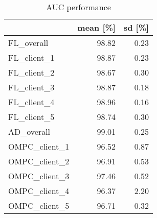\begin{table}[h]
\centering
\caption{AUC performance}
\label{tab:auc_performance}
\begin{tabular}{lrr}
\toprule
{} &  mean [\%] &  sd [\%] \\
\midrule
FL\_overall    &     98.82 &    0.23 \\
FL\_client\_1   &     98.87 &    0.23 \\
FL\_client\_2   &     98.67 &    0.30 \\
FL\_client\_3   &     98.87 &    0.18 \\
FL\_client\_4   &     98.96 &    0.16 \\
FL\_client\_5   &     98.74 &    0.30 \\
AD\_overall    &     99.01 &    0.25 \\
OMPC\_client\_1 &     96.52 &    0.87 \\
OMPC\_client\_2 &     96.91 &    0.53 \\
OMPC\_client\_3 &     97.46 &    0.52 \\
OMPC\_client\_4 &     96.37 &    2.20 \\
OMPC\_client\_5 &     96.71 &    0.32 \\
\bottomrule
\end{tabular}
\end{table}

